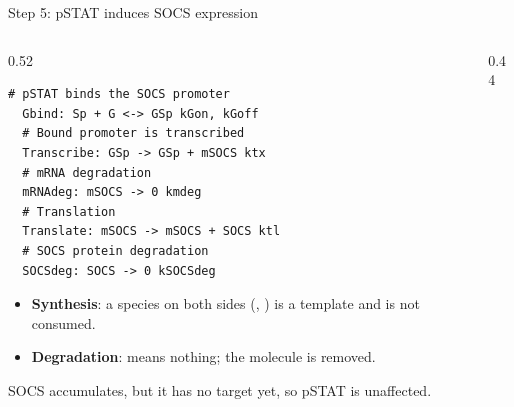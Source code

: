 \documentclass[aspectratio=169,10pt,t]{beamer}
\begin{document}
\begin{frame}[fragile]{Step 5: pSTAT induces SOCS expression}
  \begin{columns}[T]
    \begin{column}{0.52\textwidth}
\begin{lstlisting}[language=bngl,basicstyle=\ttfamily\scriptsize]
  # pSTAT binds the SOCS promoter
  Gbind: Sp + G <-> GSp kGon, kGoff
  # Bound promoter is transcribed
  Transcribe: GSp -> GSp + mSOCS ktx
  # mRNA degradation
  mRNAdeg: mSOCS -> 0 kmdeg
  # Translation
  Translate: mSOCS -> mSOCS + SOCS ktl
  # SOCS protein degradation
  SOCSdeg: SOCS -> 0 kSOCSdeg
\end{lstlisting}
      \small
      \begin{itemize}
        \item<2-> \textbf{Synthesis}: a species on both sides (, )
              is a template and is not consumed.
        \item<3-> \textbf{Degradation}:  means nothing; the molecule is removed.
      \end{itemize}
      \vskip1mm
      SOCS accumulates, but it has no target yet, so pSTAT is unaffected.
    \end{column}
    \begin{column}{0.44\textwidth}
      \centering
      \\[1mm]
    \end{column}
  \end{columns}
\end{frame}
\end{document}
